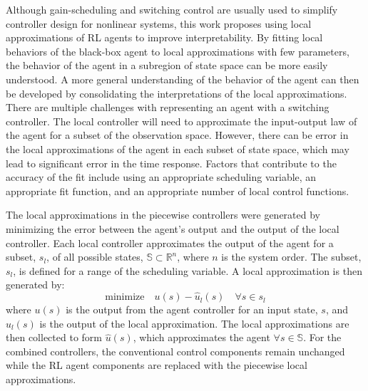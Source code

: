 Although gain-scheduling and switching control are usually used to simplify controller design for nonlinear systems, this work proposes using local approximations of RL agents to improve interpretability.
%
By fitting local behaviors of the black-box agent to local approximations with few parameters, the behavior of the agent in a subregion of state space can be more easily understood. A more general understanding of the behavior of the agent can then be developed by consolidating the interpretations of the local approximations.
%
There are multiple challenges with representing an agent with a switching controller. The local controller will need to approximate the input-output law of the agent for a subset of the observation space. However, there can be error in the local approximations of the agent in each subset of state space, which may lead to significant error in the time response.
Factors that contribute to the accuracy of the fit include using an appropriate scheduling variable, an appropriate fit function, and an appropriate number of local control functions.

The local approximations in the piecewise controllers were generated by minimizing the error between the agent's output and the output of the local controller. Each local controller approximates the output of the agent for a subset, $s_l$, of all possible states, $\mathbb{S}\subset\mathbb{R}^n$, where $n$ is the system order.
The subset, $s_l$, is defined for a range of the scheduling variable. A local approximation is then generated by:
%
\begin{equation}
\text{minimize} \quad u(s) - \hat{u}_l(s) \quad \forall s \in s_l
\end{equation}
%
where $u(s)$ is the output from the agent controller for an input state, $s$, and $\hat{u}_l(s)$ is the output of the local approximation. The local approximations are then collected to form $\hat{u}(s)$, which approximates the agent $\forall s \in \mathbb{S}$.
For the combined controllers, the conventional control components remain unchanged while the RL agent components are replaced with the piecewise local approximations.
%


